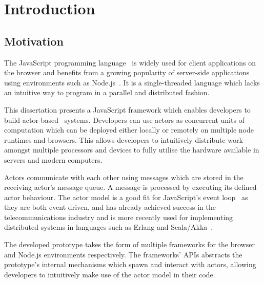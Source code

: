 \documentclass[oneside]{um-fict}
\begin{document}
\mainmatter
\chapter{Introduction}\label{chap:intro}
\section{Motivation}
The JavaScript programming language~\cite{ecmascript} is widely used for client applications on the browser and benefits from a growing popularity of server-side applications using environments such as Node.js~\cite{nodejs}. It is a single-threaded language which lacks an intuitive way to program in a parallel and distributed fashion. 

This dissertation presents a JavaScript framework which enables developers to build actor-based~\cite{hewitt1973session, 43years} systems. Developers can use actors as concurrent units of computation which can be deployed either locally or remotely on multiple node runtimes and browsers. This allows developers to intuitively distribute work amongst multiple processors and devices to fully utilise the hardware available in servers and modern computers.

Actors communicate with each other using messages which are stored in the receiving actor's message queue. A message is processed by executing its defined actor behaviour. The actor model is a good fit for JavaScript's event loop~\cite{eventloopbrowser, eventloopnode} as they are both event driven, and has already achieved success in the telecommunications industry and is more recently used for implementing distributed systems in languages such as Erlang and Scala/Akka~\cite{haller2012integration}.

The developed prototype takes the form of multiple frameworks for the browser and Node.js environments respectively. The frameworks' APIs abstracts the prototype's internal mechanisms which spawn and interact with actors, allowing developers to intuitively make use of the actor model in their code.
\end{document}
